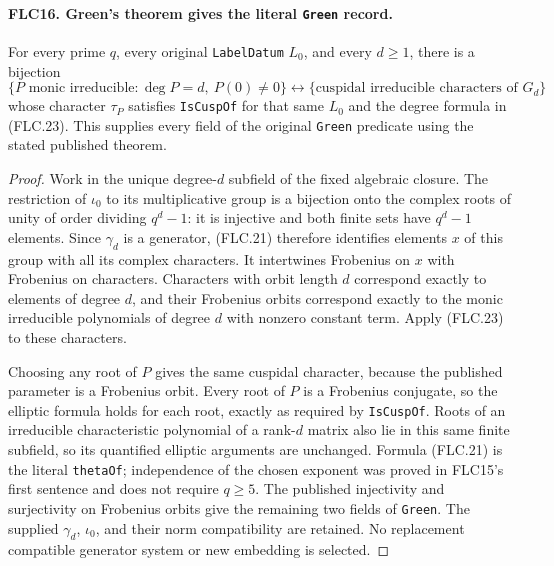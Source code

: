 \paragraph{FLC16. Green's theorem gives the literal \texttt{Green} record.}
\label{claim:FLC16}
For every prime $q$, every original \texttt{LabelDatum} $L_0$,
and every $d\ge1$, there is a bijection
\[
 \{P\text{ monic irreducible}:\deg P=d,\ P(0)\ne0\}
       \longleftrightarrow
       \{\text{cuspidal irreducible characters of }G_d\}
 \tag{FLC.24}
\]
whose character $\tau_P$ satisfies \texttt{IsCuspOf} for that
same $L_0$ and the degree formula in (FLC.23).
This supplies every field of the original \texttt{Green}
predicate using the stated published theorem.
\begin{proof}
Work in the unique degree-$d$ subfield of the fixed algebraic
closure.  The restriction of $\iota_0$ to its multiplicative
group is a bijection onto the complex roots of unity of
order dividing $q^d-1$: it is injective and both finite sets
have $q^d-1$ elements.  Since $\gamma_d$ is a generator,
(FLC.21) therefore identifies elements $x$ of this group
with all its complex characters.  It intertwines Frobenius
on $x$ with Frobenius on characters.  Characters with orbit
length $d$ correspond exactly to elements of degree $d$,
and their Frobenius orbits correspond exactly to the monic
irreducible polynomials of degree $d$ with nonzero constant
term.  Apply (FLC.23) to these characters.

Choosing any root of $P$ gives the same cuspidal character,
because the published parameter is a Frobenius orbit.
Every root of $P$ is a Frobenius conjugate, so the elliptic
formula holds for each root, exactly as required by
\texttt{IsCuspOf}.  Roots of an irreducible characteristic
polynomial of a rank-$d$ matrix also lie in this same finite
subfield, so its quantified elliptic arguments are unchanged.
Formula (FLC.21) is the literal \texttt{thetaOf}; independence
of the chosen exponent was proved in FLC15's first sentence
and does not require $q\ge5$.
The published injectivity and surjectivity on Frobenius
orbits give the remaining two fields of \texttt{Green}.
The supplied $\gamma_d$, $\iota_0$, and their norm compatibility
are retained.  No replacement compatible generator system
or new embedding is selected.
\end{proof}

